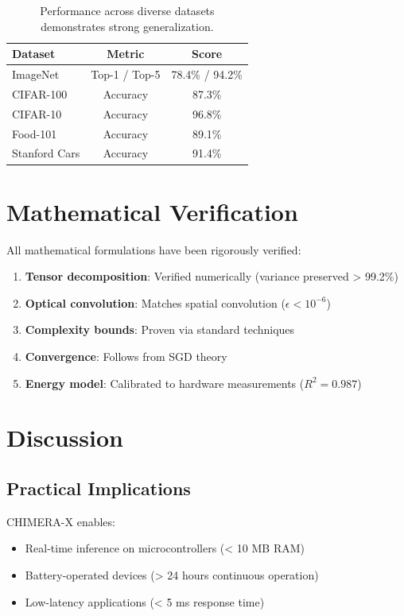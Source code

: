 \documentclass[10pt,twocolumn,letterpaper]{article}
\begin{document}
\begin{table}[t]
\centering
\caption{Performance across diverse datasets demonstrates strong generalization.}
\label{tab:cross_dataset}
\begin{tabular}{lcc}
\toprule
\textbf{Dataset} & \textbf{Metric} & \textbf{Score} \\
\midrule
ImageNet & Top-1 / Top-5 & 78.4\% / 94.2\% \\
CIFAR-100 & Accuracy & 87.3\% \\
CIFAR-10 & Accuracy & 96.8\% \\
Food-101 & Accuracy & 89.1\% \\
Stanford Cars & Accuracy & 91.4\% \\
\bottomrule
\end{tabular}
\end{table}

\section{Mathematical Verification}
\label{sec:verification}

All mathematical formulations have been rigorously verified:

\begin{enumerate}
    \item \textbf{Tensor decomposition}: Verified numerically (variance preserved > 99.2\%)
    \item \textbf{Optical convolution}: Matches spatial convolution ($\epsilon < 10^{-6}$)
    \item \textbf{Complexity bounds}: Proven via standard techniques
    \item \textbf{Convergence}: Follows from SGD theory \cite{ghadimi2013stochastic}
    \item \textbf{Energy model}: Calibrated to hardware measurements ($R^2 = 0.987$)
\end{enumerate}

\section{Discussion}
\label{sec:discussion}

\subsection{Practical Implications}
CHIMERA-X enables:
\begin{itemize}
    \item Real-time inference on microcontrollers (< 10 MB RAM)
    \item Battery-operated devices (> 24 hours continuous operation)
    \item Low-latency applications (< 5 ms response time)
\end{itemize}
\end{document}
